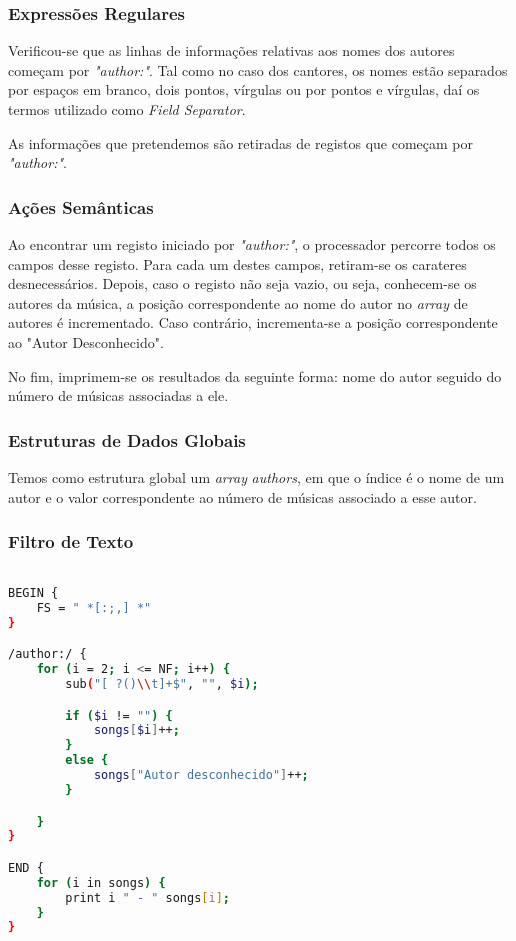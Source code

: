 \documentclass{article}
\begin{document}
\subsubsection{Expressões Regulares}

Verificou-se que as linhas de informações relativas aos nomes dos autores começam por \emph{"author:"}. Tal como no caso dos cantores, os nomes estão separados por espaços em branco, dois pontos, vírgulas ou por pontos e vírgulas, daí os termos utilizado como \emph{Field Separator}.

As informações que pretendemos são retiradas de registos que começam por \emph{"author:"}.

\subsubsection{Ações Semânticas}

Ao encontrar um registo iniciado por \emph{"author:"}, o processador percorre todos os campos desse registo. Para cada um destes campos, retiram-se os carateres desnecessários. Depois, caso o registo não seja vazio, ou seja, conhecem-se os autores da música, a posição correspondente ao nome do autor no \emph{array} de autores é incrementado. Caso contrário, incrementa-se a posição correspondente ao "Autor Desconhecido".

No fim, imprimem-se os resultados da seguinte forma: nome do autor seguido do número de músicas associadas a ele.

\subsubsection{Estruturas de Dados Globais}

Temos como estrutura global um \emph{array} \emph{authors}, em que o índice é o nome de um autor e o valor correspondente ao número de músicas associado a esse autor. 

\subsubsection{Filtro de Texto}

\begin{lstlisting}[language=bash]

BEGIN {
	FS = " *[:;,] *"
}

/author:/ {
	for (i = 2; i <= NF; i++) {
		sub("[ ?()\\t]+$", "", $i);

		if ($i != "") {
			songs[$i]++;
		}
		else {
			songs["Autor desconhecido"]++;
		}

	}
}

END {
	for (i in songs) {
		print i " - " songs[i];
	}
}

\end{lstlisting}
\end{document}
